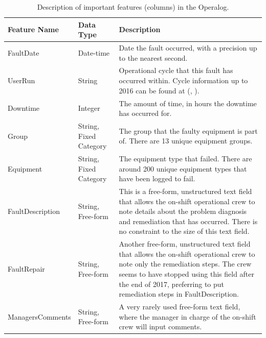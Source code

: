 \documentclass[10pt,oneside]{report}
\renewcommand{\citet}[1]{\citeauthor{#1}, \citeyear{#1}}
\begin{document}
\begin{table}[htbp]
    \fontsize{8}{11}\selectfont
    \centering
    \begin{adjustbox}{max width=\textwidth}
    \begin{tabular}{p{3cm} p{3cm} p{7cm}}
        \toprule
        \textbf{Feature Name} & \textbf{Data Type} & \textbf{Description} \\
        \midrule
        FaultDate & Date-time & Date the fault occurred, with a precision up to the nearest second. \\
        UserRun & String & Operational cycle that this fault has occurred within. Cycle information up to 2016 can be found at (\citet{isisbeamoperations2024}). \\
        Downtime & Integer & The amount of time, in hours the downtime has occurred for. \\
        Group & String, Fixed Category & The group that the faulty equipment is part of. There are 13 unique equipment groups. \\
        Equipment & String, Fixed Category & The equipment type that failed. There are around 200 unique equipment types that have been logged to fail. \\
        FaultDescription & String, Free-form & This is a free-form, unstructured text field that allows the on-shift operational crew to note details about the problem diagnosis and remediation that has occurred. There is no constraint to the size of this text field.\\
        FaultRepair & String, Free-form & Another free-form, unstructured text field that allows the on-shift operational crew to note only the remediation steps. The crew seems to have stopped using this field after the end of 2017, preferring to put remediation steps in FaultDescription. \\
        ManagersComments & String, Free-form & A very rarely used free-form text field, where the manager in charge of the on-shift crew will input comments. \\
        \bottomrule
    \end{tabular}
    \end{adjustbox}
    \caption{Description of important features (columns) in the Operalog.}
    \label{tab:operalog}
\end{table}
\end{document}
